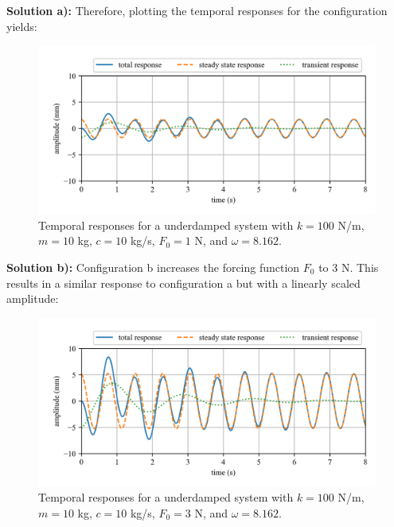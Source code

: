 \documentclass[12pt,letter]{article}
\begin{document}
\begin{example}
		
		\noindent\textbf{Solution a):} Therefore, plotting the temporal responses for the configuration yields:
		\begin{figure}[H]
			\centering
			\includegraphics[]{../figures/homogeneous_and_particular_solutions_in_resonance_a.png}
			\caption{Temporal responses for a underdamped system with $k=100$ N/m, $m=10$ kg,  $c=10$ kg/s, $F_0=1$ N, and $\omega = 8.162$.}
		\end{figure}			
 
		\noindent\textbf{Solution b):} Configuration b increases the forcing function $F_0$ to 3 N. This results in a similar response to configuration a but with a linearly scaled amplitude:
		\begin{figure}[H]
			\centering
			\includegraphics[]{../figures/homogeneous_and_particular_solutions_in_resonance_b.png}
			\caption{Temporal responses for a underdamped system with $k=100$ N/m, $m=10$ kg,  $c=10$ kg/s, $F_0=3$ N, and $\omega = 8.162$.}
		\end{figure}			
		

\end{example}
\end{document}
